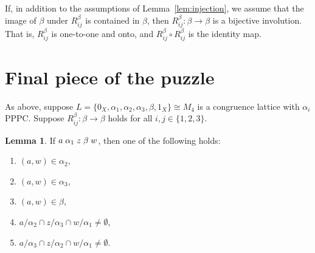 \documentclass{amsart}
\theoremstyle{plain}
\theoremstyle{definition}
\newtheorem{lemma}{Lemma}
\theoremstyle{definition}
\numberwithin{equation}{section}
\newcommand{\<}{\ensuremath{\langle}}
\renewcommand{\>}{\ensuremath{\rangle}}
\renewcommand{\leq}{\ensuremath{\leqslant}}
\newcommand{\rel}{\ensuremath{\mathrel}}
\begin{document}
If, in addition to the assumptions  of Lemma~\ref{lem:injection}, we assume that
the image of $\beta$ under $R_{ij}^\beta$ is contained in $\beta$, then 
$R_{ij}^\beta: \beta \rightarrow \beta$ is a bijective involution.
That is, $R_{ij}^\beta$ is one-to-one and onto, and 
$R_{ij}^\beta\circ R_{ij}^\beta$ is the identity map.


\section{Final piece of the puzzle}
As above, suppose $L = \{0_X, \alpha_1, \alpha_2, \alpha_3, \beta, 1_X\} \cong  M_4$ is a
congruence lattice with $\alpha_i$ \ac{PPPC}.  
Suppose $R_{ij}^\beta: \beta \rightarrow \beta$ holds for all 
$i, j \in \{1,2,3\}$.

\begin{lemma}
  \label{lem:missingpiece}
If %
$a \rel{\alpha_1} z \rel{\beta} w$,
then one of the following holds:
\begin{enumerate}
\item $(a,w) \in \alpha_2$, 
\item $(a,w) \in \alpha_3$, 
\item $(a,w) \in \beta$, 
\item $a/\alpha_2 \cap z/\alpha_3 \cap w/\alpha_1 \neq \emptyset$,
\item $a/\alpha_3 \cap z/\alpha_2 \cap w/\alpha_1 \neq \emptyset$.
\end{enumerate}
\end{lemma}
\end{document}
